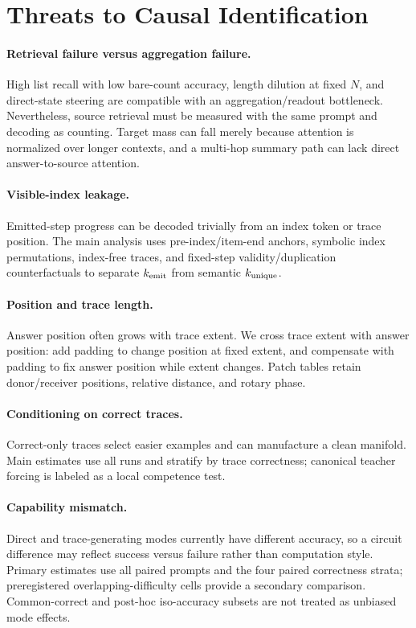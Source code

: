 \documentclass[11pt]{article}
\begin{document}
\section{Threats to Causal Identification}

\paragraph{Retrieval failure versus aggregation failure.}
High list recall with low bare-count accuracy, length dilution at fixed $N$, and direct-state steering are compatible with an aggregation/readout bottleneck. Nevertheless, source retrieval must be measured with the same prompt and decoding as counting. Target mass can fall merely because attention is normalized over longer contexts, and a multi-hop summary path can lack direct answer-to-source attention.

\paragraph{Visible-index leakage.}
Emitted-step progress can be decoded trivially from an index token or trace position. The main analysis uses pre-index/item-end anchors, symbolic index permutations, index-free traces, and fixed-step validity/duplication counterfactuals to separate $k_{\rm emit}$ from semantic $k_{\rm unique}$.

\paragraph{Position and trace length.}
Answer position often grows with trace extent. We cross trace extent with answer position: add padding to change position at fixed extent, and compensate with padding to fix answer position while extent changes. Patch tables retain donor/receiver positions, relative distance, and rotary phase.

\paragraph{Conditioning on correct traces.}
Correct-only traces select easier examples and can manufacture a clean manifold. Main estimates use all runs and stratify by trace correctness; canonical teacher forcing is labeled as a local competence test.

\paragraph{Capability mismatch.}
Direct and trace-generating modes currently have different accuracy, so a circuit difference may reflect success versus failure rather than computation style. Primary estimates use all paired prompts and the four paired correctness strata; preregistered overlapping-difficulty cells provide a secondary comparison. Common-correct and post-hoc iso-accuracy subsets are not treated as unbiased mode effects.
\end{document}
